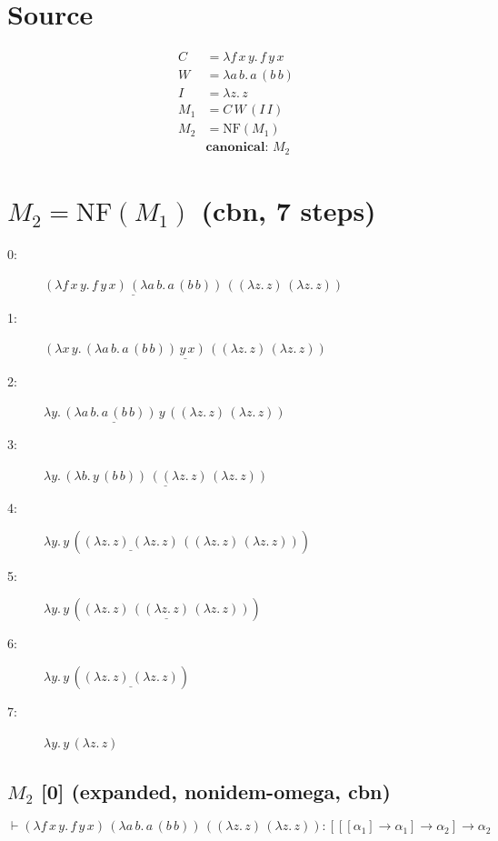 \documentclass[a4paper,landscape]{article}
\begin{document}
\section*{Source}
\begin{align*}
C &= \lambda f\,x\,y.\,f\,y\,x \\
W &= \lambda a\,b.\,a\,(b\,b) \\
I &= \lambda z.\,z \\
M_{1} &= C\,W\,(I\,I) \\
M_{2} &= \mathrm{NF}(M_{1}) \\
&\textbf{canonical: } M_{2}
\end{align*}

\section*{$M_{2} = \mathrm{NF}(M_{1})$ \quad \normalsize(cbn, 7 steps)}
\begin{description}
  \item[0:] $\underline{(\lambda f\,x\,y.\,f\,y\,x)\,(\lambda a\,b.\,a\,(b\,b))}\,((\lambda z.\,z)\,(\lambda z.\,z))$
  \item[1:] $\underline{(\lambda x\,y.\,(\lambda a\,b.\,a\,(b\,b))\,y\,x)\,((\lambda z.\,z)\,(\lambda z.\,z))}$
  \item[2:] $\lambda y.\,\underline{(\lambda a\,b.\,a\,(b\,b))\,y}\,((\lambda z.\,z)\,(\lambda z.\,z))$
  \item[3:] $\lambda y.\,\underline{(\lambda b.\,y\,(b\,b))\,((\lambda z.\,z)\,(\lambda z.\,z))}$
  \item[4:] $\lambda y.\,y\,(\underline{(\lambda z.\,z)\,(\lambda z.\,z)}\,((\lambda z.\,z)\,(\lambda z.\,z)))$
  \item[5:] $\lambda y.\,y\,(\underline{(\lambda z.\,z)\,((\lambda z.\,z)\,(\lambda z.\,z))})$
  \item[6:] $\lambda y.\,y\,(\underline{(\lambda z.\,z)\,(\lambda z.\,z)})$
  \item[7:] $\lambda y.\,y\,(\lambda z.\,z)$
\end{description}

\subsection*{$M_{2}$ [0] \quad \normalsize(expanded, nonidem-omega, cbn)}

\[  \vdash (\lambda f\,x\,y.\,f\,y\,x)\,(\lambda a\,b.\,a\,(b\,b))\,((\lambda z.\,z)\,(\lambda z.\,z)) : [[[\alpha_{1}] \to \alpha_{1}] \to \alpha_{2}] \to \alpha_{2} \]
\end{document}
